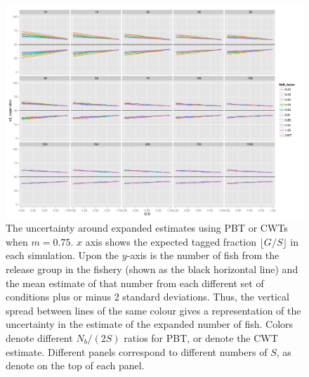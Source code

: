 \documentclass[11pt]{article}
\begin{document}
\begin{figure}
\includegraphics[width = .93\textwidth]{./images/sd_line_horns_m_0_75.pdf}
\caption{The uncertainty around expanded estimates using PBT or CWTs when $m = 0.75$.  $x$ axis shows the
expected tagged fraction $\lfloor G/S \rfloor$ in each simulation. Upon the $y$-axis is the number of fish from the
release group in the fishery (shown as the black horizontal line) and the mean estimate of that number from each different set of 
conditions plus or minus 2 standard deviations.  Thus, the vertical spread between lines of the same colour gives a representation
of the uncertainty in the estimate of the expanded number of fish. Colors denote different $N_b/(2S)$ ratios for PBT, or denote
the CWT estimate.  Different
panels correspond to different numbers of $S$, as denote on the top of each panel.
\label{fig:all_sds}}
\end{figure}
\end{document}
